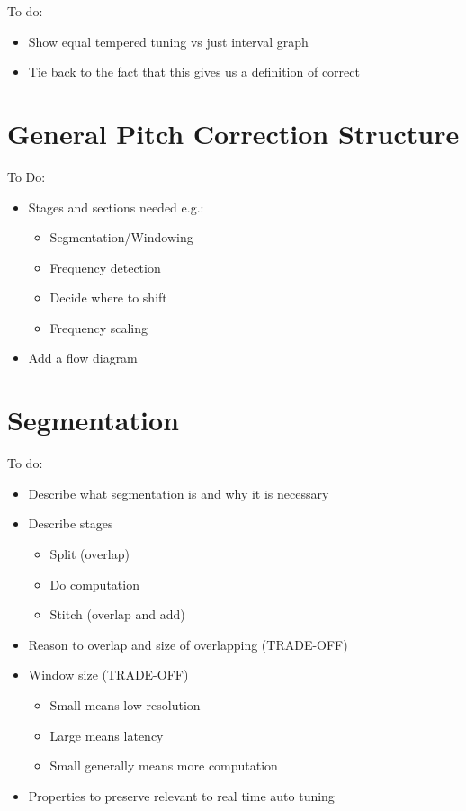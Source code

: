 \color{red}
To do:
\begin{itemize}
	\item Show equal tempered tuning vs just interval graph
	\item Tie back to the fact that this gives us a definition of correct
\end{itemize}
\color{black}

\section{General Pitch Correction Structure}

\color{red}
To Do:
\begin{itemize}
	\item Stages and sections needed e.g.:
	\begin{itemize}
		\item Segmentation/Windowing
		\item Frequency detection
		\item Decide where to shift
		\item Frequency scaling
	\end{itemize}
	\item Add a flow diagram
\end{itemize}
\color{black}

\section{Segmentation}

\color{red}
To do:
\begin{itemize}
	\item Describe what segmentation is and why it is necessary
	\item Describe stages
	\begin{itemize}
		\item Split (overlap)
		\item Do computation
		\item Stitch (overlap and add)
	\end{itemize}
	\item Reason to overlap and size of overlapping (TRADE-OFF)
	\item Window size (TRADE-OFF)
	\begin{itemize}
		\item Small means low resolution
		\item Large means latency
		\item Small generally means more computation
	\end{itemize}
	\item Properties to preserve relevant to real time auto tuning
\end{itemize}
\color{black}

